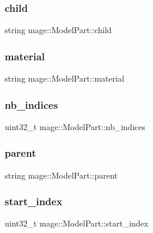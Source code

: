 \subsubsection{\texorpdfstring{child}{child}}
{\footnotesize\ttfamily string mage\+::\+Model\+Part\+::child}

\hypertarget{structmage_1_1_model_part_a4b0bfbb9ac313b6ffe8a8a3ee27469fd}{}\label{structmage_1_1_model_part_a4b0bfbb9ac313b6ffe8a8a3ee27469fd} 
\subsubsection{\texorpdfstring{material}{material}}
{\footnotesize\ttfamily string mage\+::\+Model\+Part\+::material}

\hypertarget{structmage_1_1_model_part_a4b7d8beddffa117e1f6829e6c9acfce3}{}\label{structmage_1_1_model_part_a4b7d8beddffa117e1f6829e6c9acfce3} 
\subsubsection{\texorpdfstring{nb\+\_\+indices}{nb\_indices}}
{\footnotesize\ttfamily uint32\+\_\+t mage\+::\+Model\+Part\+::nb\+\_\+indices}

\hypertarget{structmage_1_1_model_part_abd5387d6a21aa47bce04565c5333f83e}{}\label{structmage_1_1_model_part_abd5387d6a21aa47bce04565c5333f83e} 
\subsubsection{\texorpdfstring{parent}{parent}}
{\footnotesize\ttfamily string mage\+::\+Model\+Part\+::parent}

\hypertarget{structmage_1_1_model_part_af889f5bd847555d544d0ee07187e0115}{}\label{structmage_1_1_model_part_af889f5bd847555d544d0ee07187e0115} 
\subsubsection{\texorpdfstring{start\+\_\+index}{start\_index}}
{\footnotesize\ttfamily uint32\+\_\+t mage\+::\+Model\+Part\+::start\+\_\+index}

